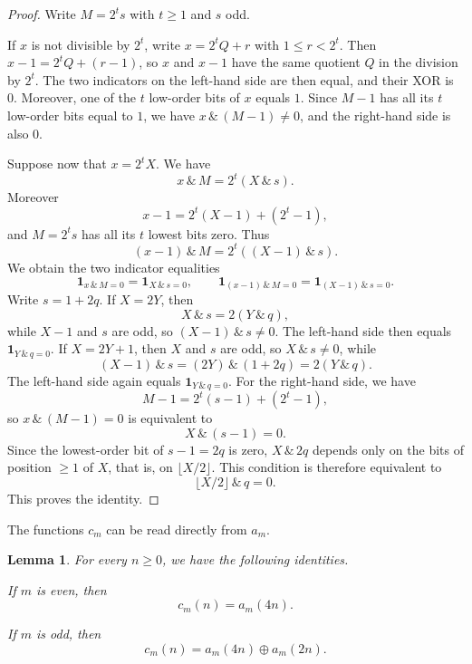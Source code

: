 \documentclass[12pt,reqno]{article}
\theoremstyle{plain}
\newtheorem{lemma}[theorem]{Lemma}
\theoremstyle{definition}
\begin{document}
\begin{proof}
Write $M = 2^t s$ with $t \ge 1$ and $s$ odd.

If $x$ is not divisible by $2^t$, write $x = 2^t Q + r$ with $1 \le r < 2^t$. Then $x-1 = 2^t Q + (r-1)$, so $x$ and $x-1$ have the same quotient $Q$ in the division by $2^t$. The two indicators on the left-hand side are then equal, and their XOR is $0$. Moreover, one of the $t$ low-order bits of $x$ equals $1$. Since $M-1$ has all its $t$ low-order bits equal to $1$, we have $x \,\&\, (M-1) \ne 0$, and the right-hand side is also $0$.

Suppose now that $x = 2^t X$. We have
\[
  x \,\&\, M = 2^t (X \,\&\, s).
\]
Moreover
\[
  x - 1 = 2^t (X - 1) + (2^t - 1),
\]
and $M = 2^t s$ has all its $t$ lowest bits zero. Thus
\[
  (x-1) \,\&\, M = 2^t ((X-1) \,\&\, s).
\]
We obtain the two indicator equalities
\[
  \mathbf{1}_{x \,\&\, M = 0} = \mathbf{1}_{X \,\&\, s = 0}, \qquad \mathbf{1}_{(x-1) \,\&\, M = 0} = \mathbf{1}_{(X-1) \,\&\, s = 0}.
\]
Write $s = 1 + 2q$. If $X = 2Y$, then
\[
  X \,\&\, s = 2(Y \,\&\, q),
\]
while $X-1$ and $s$ are odd, so $(X-1) \,\&\, s \ne 0$. The left-hand side then equals $\mathbf{1}_{Y \,\&\, q = 0}$. If $X = 2Y + 1$, then $X$ and $s$ are odd, so $X \,\&\, s \ne 0$, while
\[
  (X-1) \,\&\, s = (2Y) \,\&\, (1 + 2q) = 2(Y \,\&\, q).
\]
The left-hand side again equals $\mathbf{1}_{Y \,\&\, q = 0}$. For the right-hand side, we have
\[
  M - 1 = 2^t (s - 1) + (2^t - 1),
\]
so $x \,\&\, (M-1) = 0$ is equivalent to
\[
  X \,\&\, (s-1) = 0.
\]
Since the lowest-order bit of $s-1 = 2q$ is zero, $X \,\&\, 2q$ depends only on the bits of position $\ge 1$ of $X$, that is, on $\lfloor X/2 \rfloor$. This condition is therefore equivalent to
\[
  \lfloor X/2 \rfloor \,\&\, q = 0.
\]
This proves the identity.
\end{proof}

The functions $c_m$ can be read directly from $a_m$.

\begin{lemma}
\label{lem:correction-as-values}
For every $n\ge 0$, we have the following identities.

If $m$ is even, then
\[
  c_m(n)=a_m(4n).
\]

If $m$ is odd, then
\[
  c_m(n)=a_m(4n)\oplus a_m(2n).
\]
\end{lemma}
\end{document}
